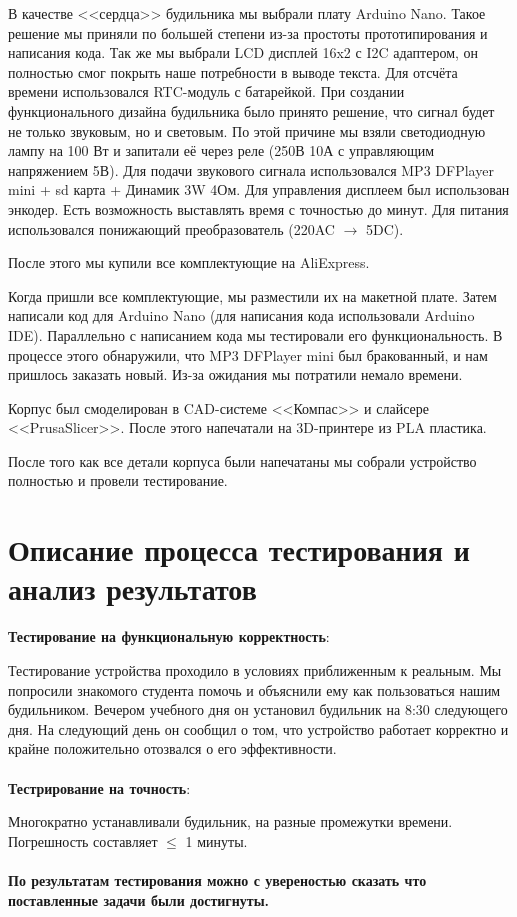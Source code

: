 \documentclass[12pt,a4paper]{article}
\begin{document}
В качестве <<сердца>> будильника мы выбрали плату Arduino Nano. Такое решение мы приняли по большей степени из-за простоты прототипирования и написания кода. Так же мы выбрали LCD дисплей 16x2 с I2C адаптером, он полностью смог покрыть наше потребности в выводе текста. Для отсчёта времени использовался RTC-модуль с батарейкой. При создании функционального дизайна будильника было принято решение, что сигнал будет не только звуковым, но и световым. По этой причине мы взяли светодиодную лампу на 100 Вт и запитали её через реле (250В 10А с управляющим напряжением 5В). Для подачи звукового сигнала использовался MP3 DFPlayer mini + sd карта + Динамик 3W 4Ом. Для управления дисплеем был использован энкодер. Есть возможность выставлять время с точностью до минут. Для питания использовался понижающий преобразователь (220AC $\rightarrow$ 5DC).

После этого мы купили все комплектующие на AliExpress.

Когда пришли все комплектующие, мы разместили их на макетной плате.
Затем написали код для Arduino Nano (для написания кода использовали Arduino IDE). Параллельно с написанием кода мы тестировали его функциональность. В процессе этого обнаружили, что MP3 DFPlayer mini был бракованный, и нам пришлось заказать новый. Из-за ожидания мы потратили немало времени.

Корпус был смоделирован в CAD-системе <<Компас>> и слайсере <<PrusaSlicer>>. После этого напечатали на 3D-принтере из PLA пластика.

После того как все детали корпуса были напечатаны мы собрали устройство полностью и провели тестирование.

\section{Описание процесса тестирования и анализ результатов}

\textbf{Тестирование на функциональную корректность}:

Тестирование устройства проходило в условиях приближенным к реальным. Мы попросили знакомого студента помочь и объяснили ему как пользоваться нашим будильником. Вечером учебного дня он установил будильник на 8:30 следующего дня. На следующий день он сообщил о том, что устройство работает корректно и крайне положительно отозвался о его эффективности.
\\ \\
\textbf{Тестрирование на точность}:

Многократно устанавливали будильник, на разные промежутки времени. Погрешность составляет $\leqslant$ 1 минуты.
\\ \\
\textbf{По результатам тестирования можно с увереностью сказать что поставленные задачи были достигнуты.}
\end{document}
